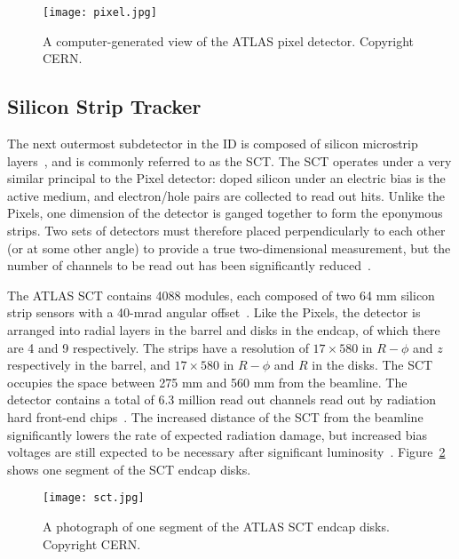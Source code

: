
\begin{figure}
\centering
\texttt{[image: pixel.jpg]}
\label{fig:detector:pixel}
\caption{A computer-generated view of the ATLAS pixel detector. Copyright CERN.}
\end{figure}




\subsection{Silicon Strip Tracker}

The next outermost subdetector in the ID is composed of silicon microstrip layers~\cite{SCTPaper,ATLASPaper}, and is commonly referred to as the SCT.  The SCT operates under a very similar principal to the Pixel detector: doped silicon under an electric bias is the active medium, and electron/hole pairs are collected to read out hits. Unlike the Pixels, one dimension of the detector is ganged together to form the eponymous strips. Two sets of detectors must therefore placed perpendicularly to each other (or at some other angle) to provide a true two-dimensional measurement, but the number of channels to be read out has been significantly reduced~\cite{Detectors}.

The ATLAS SCT contains 4088 modules, each composed of two 64 mm silicon strip sensors with a 40-mrad angular offset~\cite{ATLASPaper}. Like the Pixels, the detector is arranged into radial layers in the barrel and disks in the endcap, of which there are 4 and 9 respectively. The strips have a resolution of $17 \times 580$ in $R-\phi$ and $z$ respectively in the barrel, and $17 \times 580$ in $R-\phi$ and $R$ in the disks. The SCT occupies the space between 275 mm and 560 mm from the beamline. The detector contains a total of 6.3 million read out channels read out by radiation hard front-end chips~\cite{SCTReadout}. The increased distance of the SCT from the beamline significantly lowers the rate of expected radiation damage, but increased bias voltages are still expected to be necessary after significant luminosity~\cite{SCTPaper,ATLASPaper}.  Figure~\ref{fig:detector:sct} shows one segment of the SCT endcap disks.



\begin{figure}
\centering
\texttt{[image: sct.jpg]}
\label{fig:detector:sct}
\caption{A photograph of one segment of the ATLAS SCT endcap disks. Copyright CERN.}
\end{figure}


